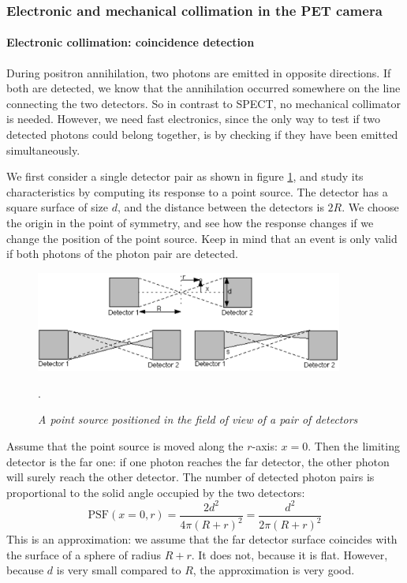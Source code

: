\documentclass[11pt,oneside]{article}
\begin{document}
\subsubsection{Electronic and mechanical collimation in the PET camera} \label{sec:petcollim}
\paragraph{Electronic collimation: coincidence detection}
During positron annihilation, two photons are emitted in opposite
directions. If both are detected, we know that the annihilation occurred
somewhere on the line connecting the two detectors. So in contrast to SPECT,
no mechanical collimator is needed. However, we need fast electronics, since
the only way to test if two detected photons could belong together, is by
checking if they have been emitted simultaneously.

We first consider a single detector pair as shown in figure
\ref{fig:petdetectorpair}, and study its characteristics by computing its
response to a point source. The detector has a square surface of size $d$, and
the distance between the detectors is $2R$. We choose the origin in the point of
symmetry, and see how the response changes if we change the position of the
point source. Keep in mind that an event is only valid if both photons of the
photon pair are detected.
%
\begin{figure}[tb]
\centering
\includegraphics[width=0.9\textwidth]{figs/fig_petdetectorpair.pdf}
\caption{\label{fig:petdetectorpair} \emph{A point source positioned in the
field of view of a pair of detectors}}.
\end{figure}

Assume that the point source is moved along the $r$-axis: $x = 0$. Then the
limiting detector is the far one: if one photon reaches the far detector, the
other photon will surely reach the other detector. The number of detected
photon pairs is proportional to the solid angle occupied by the two detectors:
\begin{equation}
  \mbox{PSF}(x=0, r) = \frac{2 d^2}{4 \pi (R+r)^2} = \frac{d^2}{2 \pi (R+r)^2}
\end{equation}
This is an approximation: we assume that the far detector surface coincides
with the surface of a sphere of radius $R+r$. It does not, because it is flat.
However, because $d$ is very small compared to $R$, the approximation is very
good.
\end{document}
